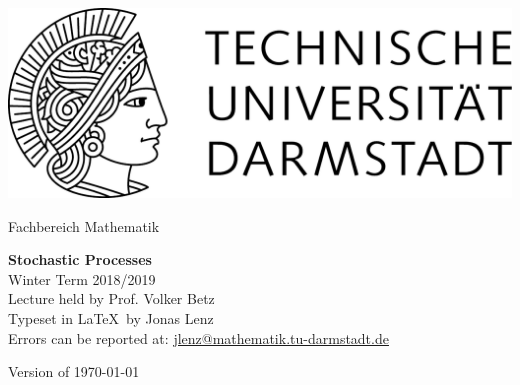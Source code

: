 \documentclass[12pt,a4paper,twoside]{scrreprt}
\begin{document}
\hypersetup{pageanchor=false}
\begin{titlepage}
  \begin{center}
    \vspace{1cm}
    \includegraphics[width=0.5\linewidth]{TU_Darmstadt_Logo.pdf}
    \vspace{1cm}
    
    \large{Fachbereich Mathematik}
    \vspace{3.5cm}
    
    \Huge{\textbf{Stochastic Processes}\\}
    \vspace*{0.5cm}    
    \Large{{Winter Term 2018/2019}\\}
    \vspace*{0.5cm}    
    \small{Lecture held by Prof. Volker Betz\\}
    \vspace*{1.0cm}
    \small{Typeset in \LaTeX\ by Jonas Lenz\\}
    \small{Errors can be reported at: \href{mailto:jlenz@mathematik.tu-darmstadt.de}{jlenz@mathematik.tu-darmstadt.de}}

    \vspace*{\fill}
    \small{Version of \today}
  \end{center}
\end{titlepage}

\hypersetup{pageanchor=true}
\tableofcontents


%
%
%
%
\end{document}
